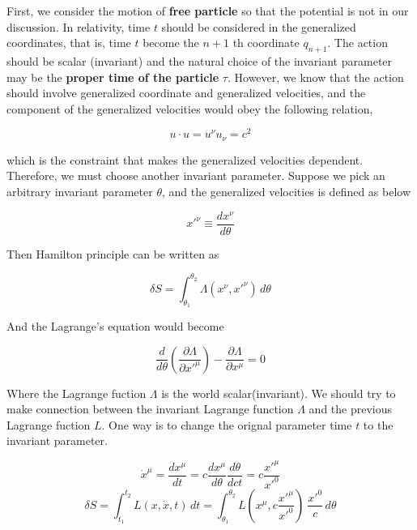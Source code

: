 \documentclass[12pt]{article}
\begin{document}
First, we consider the motion of \textbf{free particle} so that the potential is not in our discussion. In relativity, time $t$ should be considered in the generalized coordinates, that is, time $t$ become the $n+1$ th coordinate $q_{n+1}$. The action should be scalar (invariant) and the natural choice of the invariant parameter may be the \textbf{proper time of the particle} $\tau$. However, we know that the action should involve generalized coordinate and generalized velocities, and the component of the generalized velocities would obey the following relation,

\begin{center}
    \[ u \cdot u = u^{\nu} u_{\nu} = c^2 \]
\end{center}
 
which is the constraint that makes the generalized velocities dependent.
Therefore, we must choose another invariant parameter. Suppose we pick an arbitrary invariant parameter $\theta$, and the generalized velocities is defined as below

\begin{center}
    \[ x'^{\nu} \equiv \frac{d x^{\nu}}{d \theta}\]
\end{center}

Then Hamilton principle can be written as 

\begin{center}
    \[ \delta S = \int_{\theta_1}^{\theta_2} \Lambda (x^{\nu}, x'^{\nu}) \,d\theta \]
\end{center}

And the Lagrange's equation would become

\begin{center}
    \[ \frac{d}{d \theta} \left( \frac{\partial \Lambda}{\partial x'^{\mu}} \right) - \frac{\partial \Lambda}{\partial x^{\mu}} = 0 \]
\end{center}
Where the Lagrange fuction $\Lambda$ is the world scalar(invariant).
We should try to make connection between the invariant Lagrange function $\Lambda$ and the previous Lagrange fuction $L$. One way is to change the orignal parameter time $t$ to the invariant parameter.

\begin{center}
    \[ \dot{x}^{\mu} = \frac{dx^{\mu}}{dt} = c\frac{dx^{\mu}}{d\theta} \frac{d\theta}{dct} = c\frac{x'^{\mu}}{x'^{0}} \]
    \[ \delta S = \int_{t_1}^{t_2} L (x, \dot{x}, t) \,dt = \int_{\theta_1}^{\theta_2} L( x^{\mu}, c\frac{x'^{\mu}}{x'^{0}} )\ \frac{x'^{0}}{c} \, d\theta \]
\end{center}
\end{document}

